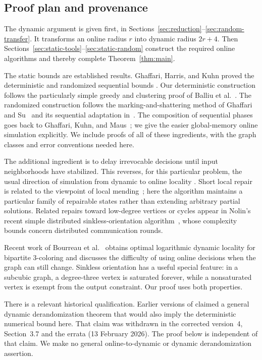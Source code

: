 \documentclass[11pt]{article}
\theoremstyle{definition}
\begin{document}
\subsection{Proof plan and provenance}\label{sec:provenance}

The dynamic argument is given first, in
Sections~\ref{sec:reduction}--\ref{sec:random-transfer}. It transforms an
online radius $r$ into dynamic radius $2r+4$. Then
Sections~\ref{sec:static-tools}--\ref{sec:static-random} construct the required
online algorithms and thereby complete Theorem~\ref{thm:main}.

The static bounds are established results. Ghaffari, Harris, and Kuhn
proved the deterministic and randomized sequential bounds
\cite[Theorems 7.2 and 7.3]{GHK}. Our deterministic construction follows the
particularly simple greedy and clustering proof of Balliu et
al.~\cite[Section 3]{simple}. The randomized construction follows the
marking-and-shattering method of Ghaffari and Su~\cite{GS} and its sequential
adaptation in~\cite[Algorithm 3]{GHK}. The composition of sequential phases
goes back to Ghaffari, Kuhn, and Maus~\cite{GKM}; we give the easier
global-memory online simulation explicitly. We include proofs of all of
these ingredients, with the graph classes and error conventions needed here.

The additional ingredient is to delay irrevocable decisions until input
neighborhoods have stabilized. This reverses, for this particular problem,
the usual direction of simulation from dynamic to online locality
\cite{models}. Short local repair is related to the viewpoint of local
mending~\cite{mending}; here the algorithm maintains a particular family of
repairable states rather than extending arbitrary partial solutions.
Related repairs toward low-degree vertices or cycles appear in Nolin's
recent simple distributed sinkless-orientation algorithm~\cite{Nolin},
whose complexity bounds concern distributed communication rounds.

Recent work of Bourreau et al.~\cite{coloring} obtains optimal logarithmic
dynamic locality for bipartite 3-coloring and discusses the difficulty of
using online decisions when the graph can still change. Sinkless orientation
has a useful special feature: in a subcubic graph, a degree-three vertex is
saturated forever, while a nonsaturated vertex is exempt from the output
constraint. Our proof uses both properties.

There is a relevant historical qualification. Earlier versions of
\cite{quantum} claimed a general dynamic derandomization theorem that would
also imply the deterministic numerical bound here. That claim was withdrawn
in the corrected version~4, Section~3.7 and the errata (13 February 2026).
The proof below is independent of that claim. We make no general
online-to-dynamic or dynamic derandomization assertion.
\end{document}
